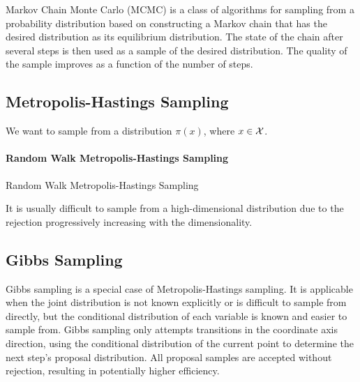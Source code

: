 Markov Chain Monte Carlo (MCMC) is a class of algorithms for sampling from a probability distribution based on constructing a Markov chain that has the desired distribution as its equilibrium distribution. The state of the chain after several steps is then used as a sample of the desired distribution. The quality of the sample improves as a function of the number of steps.

\subsection{Metropolis-Hastings Sampling}

We want to sample from a distribution \(\pi(x)\), where \(x\in \mathcal{X}\).

\paragraph*{Random Walk Metropolis-Hastings Sampling}

\begin{algorithm}
	\caption{Random Walk Metropolis-Hastings Sampling}
\end{algorithm}

\begin{remark}
	It is usually difficult to sample from a high-dimensional distribution due to the rejection progressively increasing with the dimensionality.
\end{remark}

\subsection{Gibbs Sampling}

Gibbs sampling is a special case of Metropolis-Hastings sampling. It is applicable when the joint distribution is not known explicitly or is difficult to sample from directly, but the conditional distribution of each variable is known and easier to sample from. Gibbs sampling only attempts transitions in the coordinate axis direction, using the conditional distribution of the current point to determine the next step's proposal distribution. All proposal samples are accepted without rejection, resulting in potentially higher efficiency.

